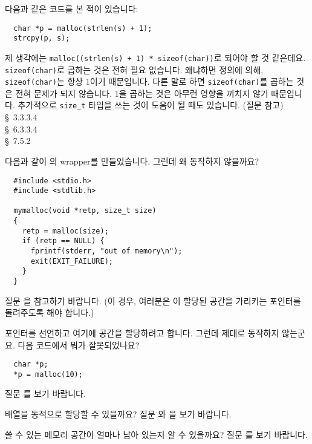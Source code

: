 \begin{faq}
	다음과 같은 코드를 본 적이 있습니다:
\begin{verbatim}
  char *p = malloc(strlen(s) + 1);
  strcpy(p, s);
\end{verbatim}
	\noindent 제 생각에는 \verb?malloc((strlen(s) + 1) * sizeof(char))?로
	되어야 할 것 같은데요.
\A
	\verb+sizeof(char)+로 곱하는 것은 전혀 필요 없습니다.
        왜냐하면 정의에 의해, \verb+sizeof(char)+는 항상 1이기 때문입니다.
	다른 말로 하면 \verb+sizeof(char)+를 곱하는 것은 전혀 문제가
	되지 않습니다.  1을 곱하는 것은 아무런 영향을 끼치지 않기 때문입니다.
	추가적으로 \verb+size_t+ 타입을 쓰는 것이 도움이 될 때도 있습니다.
        (질문  참고)  
\R
	\cite{ansi} \S\ 3.3.3.4 \\
	\cite{c89} \S\ 6.3.3.4 \\
	\cite{hs} \S\ 7.5.2 
\end{faq}

\begin{faq}
        다음과 같이 의 wrapper를 만들었습니다. 그런데 왜 동작하지
        않을까요?
\begin{verbatim}
  #include <stdio.h>
  #include <stdlib.h>

  mymalloc(void *retp, size_t size)
  {
    retp = malloc(size);
    if (retp == NULL) {
      fprintf(stderr, "out of memory\n");
      exit(EXIT_FAILURE);
    }
  }
\end{verbatim}
\A
        질문 을 참고하기 바랍니다. (이 경우, 여러분은 이 할당된
        공간을 가리키는 포인터를 돌려주도록 해야 합니다.)
\end{faq}

\begin{faq}
        포인터를 선언하고 여기에 공간을 할당하려고 합니다. 그런데 제대로
        동작하지 않는군요. 다음 코드에서 뭐가 잘못되었나요?
\begin{verbatim}
  char *p;
  *p = malloc(10);
\end{verbatim}
\A
        질문 를 보기 바랍니다.
\end{faq}


\begin{faq}
        배열을 동적으로 할당할 수 있을까요?
\A
        질문 와 을 보기 바랍니다.
\end{faq}

\begin{faq}
        쓸 수 있는 메모리 공간이 얼마나 남아 있는지 알 수 있을까요?
\A
        질문 를 보기 바랍니다.
\end{faq}

